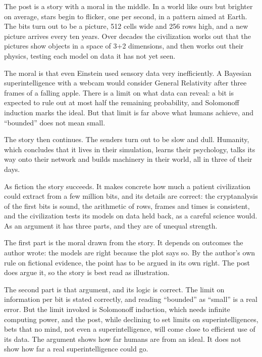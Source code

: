 \begin{afterword}
\summaryhead

The post is a story with a moral in the middle. In a world like ours but brighter on average, stars begin to flicker, one per second, in a pattern aimed at Earth. The bits turn out to be a picture, 512 cells wide and 256 rows high, and a new picture arrives every ten years. Over decades the civilization works out that the pictures show objects in a space of 3+2 dimensions, and then works out their physics, testing each model on data it has not yet seen.

The moral is that even Einstein used sensory data very inefficiently. A Bayesian superintelligence with a webcam would consider General Relativity after three frames of a falling apple. There is a limit on what data can reveal: a bit is expected to rule out at most half the remaining probability, and Solomonoff induction marks the ideal. But that limit is far above what humans achieve, and ``bounded'' does not mean small.

The story then continues. The senders turn out to be slow and dull. Humanity, which concludes that it lives in their simulation, learns their psychology, talks its way onto their network and builds machinery in their world, all in three of their days.

\responsehead

As fiction the story succeeds. It makes concrete how much a patient civilization could extract from a few million bits, and its details are correct: the cryptanalysis of the first bits is sound, the arithmetic of rows, frames and times is consistent, and the civilization tests its models on data held back, as a careful science would. As an argument it has three parts, and they are of unequal strength.

The first part is the moral drawn from the story. It depends on outcomes the author wrote: the models are right because the plot says so. By the author's own rule on fictional evidence, the point has to be argued in its own right. The post does argue it, so the story is best read as illustration.

The second part is that argument, and its logic is correct. The limit on information per bit is stated correctly, and reading ``bounded'' as ``small'' is a real error. But the limit invoked is Solomonoff induction, which needs infinite computing power, and the post, while declining to set limits on superintelligences, bets that no mind, not even a superintelligence, will come close to efficient use of its data. The argument shows how far humans are from an ideal. It does not show how far a real superintelligence could go.


\end{afterword}
